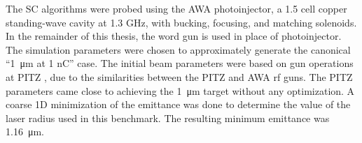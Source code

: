 The SC algorithms were probed using the AWA photoinjector, 
a 1.5 cell copper standing-wave cavity at 1.3 GHz, 
with bucking, focusing, and matching solenoids. 
In the remainder of this thesis, the word gun is used 
in place of photoinjector. The simulation parameters were chosen to 
approximately generate the canonical “\SI{1}{\micro\metre} at 1 nC” case.
The initial beam parameters were based on gun operations at PITZ \cite{pitz},
due to the similarities between the PITZ and AWA rf guns.
The PITZ parameters came close to achieving the \SI{1}{\micro\metre}
target without any optimization. A coarse 1D minimization
 of the 
emittance was done to determine the value of the laser radius 
used in this benchmark. The resulting minimum emittance was   
\SI{1.16}{\micro\metre}. 

